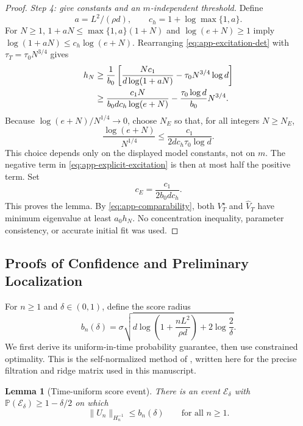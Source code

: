 \documentclass[10pt,twoside,letterpaper]{article}
\newtheorem{lemma}{Lemma}[section]
\newcommand{\Prob}{\mathbb P}
\newcommand{\norm}[1]{\lVert #1\rVert}
\newcommand{\Vhat}{\widehat V}
\begin{document}
\begin{proof}
\textit{Step 4: give constants and an $m$-independent threshold.}
Define
\begin{equation}
a=L^2/(\rho d),\qquad c_h=1+\log\max\{1,a\}.
\label{eq:app-log-constant}
\end{equation}
For $N\ge1$, $1+aN\le\max\{1,a\}(1+N)$ and $\log(e+N)\ge1$ imply
$\log(1+aN)\le c_h\log(e+N)$. Rearranging
\eqref{eq:app-excitation-det} with $\tau_T=\tau_0N^{3/4}$ gives
\begin{align}
h_N
&\ge\frac1{b_0}\left[
\frac{Nc_1}{d\log(1+aN)}-\tau_0N^{3/4}\log d\right]\notag\\
&\ge\frac{c_1N}{b_0dc_h\log(e+N)}
-\frac{\tau_0\log d}{b_0}N^{3/4}.
\label{eq:app-explicit-excitation}
\end{align}
Because $\log(e+N)/N^{1/4}\to0$, choose $N_E$ so that, for all
integers $N\ge N_E$,
\begin{equation}
\frac{\log(e+N)}{N^{1/4}}
\le\frac{c_1}{2dc_h\tau_0\log d}.
\label{eq:app-excitation-threshold}
\end{equation}
This choice depends only on the displayed model constants, not on $m$.
The negative term in \eqref{eq:app-explicit-excitation} is then at most
half the positive term. Set
\begin{equation}
c_E=\frac{c_1}{2b_0dc_h}.
\label{eq:app-excitation-final-constant}
\end{equation}
This proves the lemma. By \eqref{eq:app-comparability}, both
$V_T^\star$ and $\Vhat_T$ have minimum eigenvalue at least $a_0h_N$.
No concentration inequality, parameter consistency, or accurate
initial fit was used.
\end{proof}

\subsection{Proofs of Confidence and Preliminary Localization}
\label{app:localization}

For $n\ge1$ and $\delta\in(0,1)$, define the score radius
\begin{equation}
b_n(\delta)=\sigma\sqrt{
 d\log\!\left(1+\frac{nL^2}{\rho d}\right)+2\log\frac2\delta}.
\label{eq:app-score-radius}
\end{equation}
We first derive its uniform-in-time probability guarantee, then use
constrained optimality. This is the self-normalized method of
\citet[Theorem 1]{AbbasiYadkori2011}, written here for the precise
filtration and ridge matrix used in this manuscript.

\begin{lemma}[Time-uniform score event]
\label{lem:score}
There is an event $\mathcal E_\delta$ with
$\Prob(\mathcal E_\delta)\ge1-\delta/2$ on which
\begin{equation}
\norm{U_n}_{H_n^{-1}}\le b_n(\delta)\qquad\text{for all }n\ge1.
\label{eq:app-self-normalized}
\end{equation}
\end{lemma}
\end{document}
